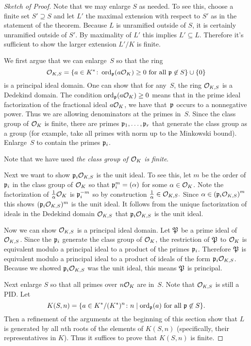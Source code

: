 \begin{proof}[Sketch of Proof]
	Note that we may enlarge $S$ as needed. To see this,
	choose a finite set $S' \supseteq S$ and let $L'$ the
	maximal extension with respect to $S'$ as in the
	statement of the theorem. Because $L$ is unramified
	outside of $S$, it is certainly unramified outside of
	$S'$. By maximality of $L'$ this implies $L' \subseteq L$.
	Therefore it's sufficient to show the larger extension
	$L'/K$ is finite.
	
	We first argue that we can enlarge~$S$ so that the ring
	$$
		\O_{K,S} =
			\{
			a \in K^* \colon \ord_\p(a\O_K) \geq 0 \text{ for all } \p\not\in S
			\}
			\union\{0\}
	$$
	is a principal ideal domain.
	One can show that for any~$S$, the ring $\O_{K,S}$ is a Dedekind domain.
	The condition $ \ord_\p(a\O_K) \geq 0$
	means that in the prime ideal factorization of the fractional ideal
	$a\O_K$, we have that~$\p$ occurs to a nonnegative power. Thus we are
	allowing denominators at the primes in~$S$. Since the class group of
	$\O_K$ is finite, there are primes $\p_1,\ldots, \p_r$ that generate
	the class group as a group (for example, take all primes with norm up to
	the Minkowski bound). Enlarge~$S$ to contain the primes $\p_i$.
	
	Note that we have used \emph{the class group of $\O_K$ is finite}.
	
	Next we want to show $\p_i\O_{K,S}$ is the unit ideal. To see this,
	let $m$ be the order of $\p_i$ in the class group of $\O_{K}$ so that
	$\p_i^m = (\alpha)$ for some $\alpha\in \O_{K}$. Note the factorization
	of $\frac{1}{\alpha}\O_{K}$ is $\p_i^{-m}$ so by construction
	$\frac{1}{\alpha}\in\O_{K,S}.$ Since
	$\alpha\in \left(\p_i\O_{K,S}\right)^m$ this shows $(\p_i\O_{K,S})^m$
	is the unit ideal. It follows from the unique factorization of ideals
	in the Dedekind domain $\O_{K,S}$ that $\p_i\O_{K,S}$ is the unit ideal.
	
	Now we can show $\O_{K,S}$ is a principal ideal domain. Let $\P$
	be a prime ideal of $\O_{K,S}$. Since the $\p_i$ generate
	the class group of $\O_K$, the restriction of $\P$ to $\O_K$ is
	equivalent modulo a principal ideal to a product of the primes
	$\p_i$. Therefore $\P$ is equivalent modulo a principal ideal
	to a product of ideals of the form $\p_i\O_{K,S}$. Because we showed
	$\p_i\O_{K,S}$ was the unit ideal, this means $\P$ is principal.
	
	Next enlarge $S$ so that all primes over $n\O_K$ are in~$S$.
	Note that $\O_{K,S}$ is still a PID.  Let
	$$
	 K(S,n) =
	 	\{
	 	a \in K^*/(K^*)^n \colon n \mid \ord_\p(a) \text{ for all } \p\not\in S
	 	\}.
	$$
	Then a refinement of the arguments at the beginning of
	this section show that $L$ is generated by all $n$th roots
	of the elements of $K(S,n)$ (specifically, their representatives in $K$).
	Thus it suffices to prove that $K(S,n)$ is finite.
	

\end{proof}
